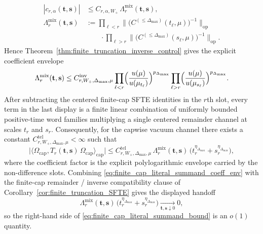 \begin{lemFspecial}
\[\begin{aligned}
|c_{r,\alpha}(\mathbf t,\mathbf s)|
&\le
C_{r,\alpha,W_+}\,\Lambda^{\mathrm{mix}}_{r}(\mathbf t,\mathbf s),\\
\Lambda^{\mathrm{mix}}_{r}(\mathbf t,\mathbf s)
&:=
\prod_{\ell<r}\big\|\big(C^{(\le \Delta_{\max})}(t_\ell,\mu)\big)^{-1}\big\|_{\mathrm{op}}\\
&\qquad\cdot
\prod_{\ell>r}\big\|\big(C^{(\le \Delta_{\max})}(s_\ell,\mu)\big)^{-1}\big\|_{\mathrm{op}}.
\end{aligned}
\]
Hence Theorem~\ref{thm:finite_truncation_inverse_control} gives the explicit coefficient envelope
\begin{equation}\label{eq:finite_cap_literal_summand_coeff_env}
\Lambda^{\mathrm{mix}}_{r}(\mathbf t,\mathbf s)
\le
C^{\mathrm{inv}}_{r,W_+,\Delta_{\max},\mu}
\prod_{\ell<r}\Bigl(\frac{u(\mu)}{u(\mu_{t_\ell})}\Bigr)^{p_{\Delta_{\max}}}
\prod_{\ell>r}\Bigl(\frac{u(\mu)}{u(\mu_{s_\ell})}\Bigr)^{p_{\Delta_{\max}}}.
\end{equation}
After subtracting the centered finite-cap SFTE identities in the $r$th slot, every term in the last display is a finite linear combination of uniformly bounded positive-time word families multiplying a single centered remainder channel at scales $t_r$ and $s_r$.
Consequently, for the capwise vacuum channel there exists a constant $C^{\mathrm{tel}}_{r,W_+,\Delta_{\max},\mu}<\infty$ such that
\begin{equation}\label{eq:finite_cap_literal_summand_bound}
\Big|
\big\langle \Omega_{\mathrm{cap}},T_r(\mathbf t,\mathbf s)\,\Omega_{\mathrm{cap}}\big\rangle_{\mathrm{cap}}
\Big|
\le
C^{\mathrm{tel}}_{r,W_+,\Delta_{\max},\mu}\,
\Lambda^{\mathrm{mix}}_{r}(\mathbf t,\mathbf s)\,
\bigl(t_r^{\eta_{\Delta_{\max}}}+s_r^{\eta_{\Delta_{\max}}}\bigr),
\end{equation}
where the coefficient factor is the explicit polylogarithmic envelope carried by the non-difference slots.
Combining \eqref{eq:finite_cap_literal_summand_coeff_env} with the finite-cap remainder / inverse compatibility clause of Corollary~\ref{cor:finite_truncation_SFTE} gives the displayed handoff
\begin{equation}\label{eq:finite_cap_literal_summand_o1}
\Lambda^{\mathrm{mix}}_{r}(\mathbf t,\mathbf s)\,
\bigl(t_r^{\eta_{\Delta_{\max}}}+s_r^{\eta_{\Delta_{\max}}}\bigr)
\xrightarrow[\mathbf t,\mathbf s\downarrow 0]{}0,
\end{equation}
so the right-hand side of \eqref{eq:finite_cap_literal_summand_bound} is an $o(1)$ quantity.
\end{lemFspecial}

